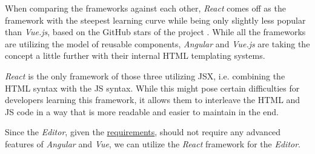 When comparing the frameworks against each other, \textit{React} comes off as the framework with the steepest learning curve while being only slightly less popular than \textit{Vue.js}, based on the GitHub stars of the project .
While all the frameworks are utilizing the model of reusable components, \textit{Angular} and \textit{Vue.js} are taking the concept a little further with their internal \acs{HTML} templating systems.

\textit{React} is the only framework of those three utilizing \acs{JSX}, i.e. combining the \acs{HTML} syntax with the \acs{JS} syntax. 
While this might pose certain difficulties for developers learning this framework, it allows them to interleave the \acs{HTML} and \acs{JS} code in a way that is more readable and easier to maintain in the end.

Since the \textit{Editor}, given the \hyperref[requirements]{requirements}, should not require any advanced features of \textit{Angular} and \textit{Vue}, 
we can utilize the \textit{React} framework for the \textit{Editor}.

\subsubsection{}